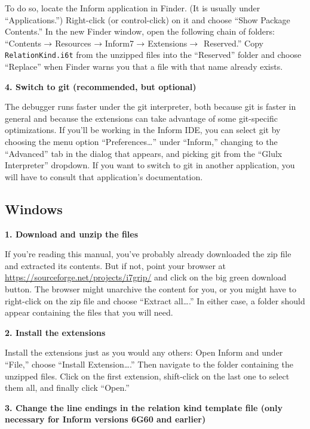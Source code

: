 \documentclass{book}
\newcommand{\lastpagebreak}{\vfill\pagebreak}
\newcommand{\nil}{{\null}}
\newcommand{\thento}{\(\nil\rightarrow\nil\)}
\begin{document}
To do so, locate the Inform application in Finder.  (It is usually under
``Applications.'')  Right-click (or control-click) on it and choose ``Show
Package Contents.''  In the new Finder window, open the following chain of
folders: ``Contents\thento Resources\thento Inform7\thento Extensions\thento
Reserved.''  Copy \texttt{RelationKind.i6t} from the unzipped files into the
``Reserved'' folder and choose ``Replace'' when Finder warns you that a file
with that name already exists.

\textbf{4. Switch to git (recommended, but optional)}

The debugger runs faster under the git interpreter, both because git is faster
in general and because the extensions can take advantage of some git-specific
optimizations.  If you'll be working in the Inform IDE, you can select git by
choosing the menu option ``Preferences\dots'' under ``Inform,'' changing to the
``Advanced'' tab in the dialog that appears, and picking git from the ``Glulx
Interpreter'' dropdown.  If you want to switch to git in another application,
you will have to consult that application's documentation.

\lastpagebreak

\subsection{Windows}

\textbf{1. Download and unzip the files}

If you're reading this manual, you've probably already downloaded the zip file
and extracted its contents.  But if not, point your browser at
\url{https://sourceforge.net/projects/i7grip/} and click on the big green
download button.  The browser might unarchive the content for you, or you might
have to right-click on the zip file and choose ``Extract all\dots.''  In either
case, a folder should appear containing the files that you will need.

\textbf{2. Install the extensions}

Install the extensions just as you would any others: Open Inform and under
``File,'' choose ``Install Extension\dots.''  Then navigate to the folder
containing the unzipped files.  Click on the first extension, shift-click on the
last one to select them all, and finally click ``Open.''

\textbf{3. Change the line endings in the relation kind template file (only
  necessary for Inform versions 6G60 and earlier)}
\end{document}
